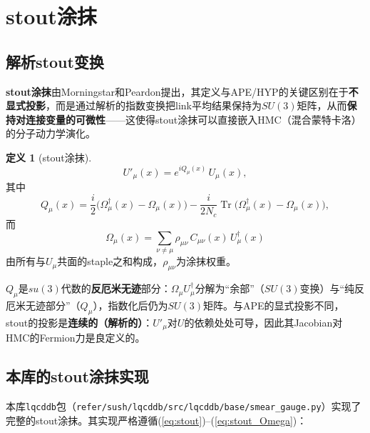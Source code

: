 \documentclass[12pt,a4paper]{ctexart}
\theoremstyle{definition}
\newtheorem{definition}{定义}[section]
\begin{document}
\section{stout涂抹}

\subsection{解析stout变换}

\textbf{stout涂抹}由Morningstar和Peardon提出\cite{Morningstar2004}，其定义与APE/HYP的关键区别在于\textbf{不显式投影}，而是通过解析的指数变换把link平均结果保持为$SU(3)$矩阵，从而\textbf{保持对连接变量的可微性}——这使得stout涂抹可以直接嵌入HMC（混合蒙特卡洛）的分子动力学演化。

\begin{definition}[stout涂抹]
\begin{equation}
\boxed{U'_\mu(x) = e^{iQ_\mu(x)}\, U_\mu(x)},
\label{eq:stout}
\end{equation}
其中
\begin{equation}
Q_\mu(x) = \frac{i}{2}\Big( \Omega_\mu^\dagger(x) - \Omega_\mu(x) \Big) - \frac{i}{2N_c}\operatorname{Tr}\Big( \Omega_\mu^\dagger(x) - \Omega_\mu(x) \Big),
\label{eq:stout_Q}
\end{equation}
而
\begin{equation}
\Omega_\mu(x) = \sum_{\nu \ne \mu} \rho_{\mu\nu}\, C_{\mu\nu}(x)\, U^\dagger_\mu(x)
\label{eq:stout_Omega}
\end{equation}
由所有与$U_\mu$共面的staple之和构成，$\rho_{\mu\nu}$为涂抹权重。
\end{definition}

$Q_\mu$是$su(3)$代数的\textbf{反厄米无迹}部分：$\Omega_\mu U^\dagger_\mu$分解为``余部''（$SU(3)$变换）与``纯反厄米无迹部分''（$Q_\mu$），指数化后仍为$SU(3)$矩阵。与APE的显式投影不同，stout的投影是\textbf{连续的（解析的）}：$U'_\mu$对$U$的依赖处处可导，因此其Jacobian对HMC的Fermion力是良定义的。

\subsection{本库的stout涂抹实现}

本库\texttt{lqcddb}包（\texttt{refer/sush/lqcddb/src/lqcddb/base/smear\_gauge.py}）实现了完整的stout涂抹。其实现严格遵循(\ref{eq:stout})–(\ref{eq:stout_Omega})：
\end{document}
